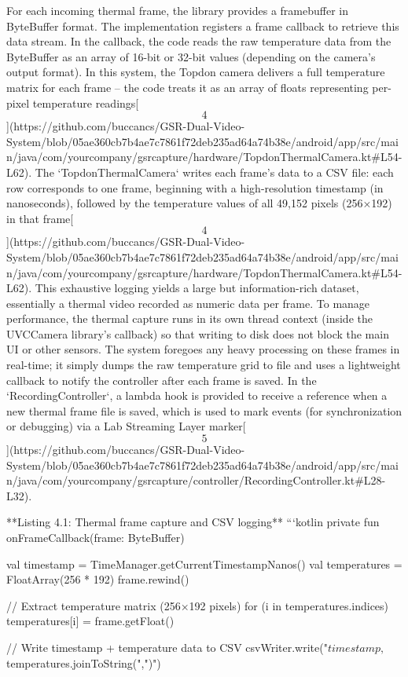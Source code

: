 \documentclass[12pt,a4paper]{article}
\begin{document}
{For each incoming thermal frame, the library provides a framebuffer in
ByteBuffer format. The implementation registers a frame callback to
retrieve this data stream. In the callback, the code reads the raw
temperature data from the ByteBuffer as an array of 16-bit or 32-bit
values (depending on the camera's output format). In this system, the
Topdon camera delivers a full temperature matrix for each frame -- the
code treats it as an array of floats representing per-pixel temperature
readings[\[4\]](https://github.com/buccancs/GSR-Dual-Video-System/blob/05ae360cb7b4ae7c7861f72deb235ad64a74b38e/android/app/src/main/java/com/yourcompany/gsrcapture/hardware/TopdonThermalCamera.kt#L54-L62).
The `TopdonThermalCamera` writes each frame's data to a CSV file: each
row corresponds to one frame, beginning with a high-resolution timestamp
(in nanoseconds), followed by the temperature values of all 49,152
pixels (256×192) in that
frame[\[4\]](https://github.com/buccancs/GSR-Dual-Video-System/blob/05ae360cb7b4ae7c7861f72deb235ad64a74b38e/android/app/src/main/java/com/yourcompany/gsrcapture/hardware/TopdonThermalCamera.kt#L54-L62).
This exhaustive logging yields a large but information-rich dataset,
essentially a thermal video recorded as numeric data per frame. To
manage performance, the thermal capture runs in its own thread context
(inside the UVCCamera library's callback) so that writing to disk does
not block the main UI or other sensors. The system foregoes any heavy
processing on these frames in real-time; it simply dumps the raw
temperature grid to file and uses a lightweight callback to notify the
controller after each frame is saved. In the `RecordingController`, a
lambda hook is provided to receive a reference when a new thermal frame
file is saved, which is used to mark events (for synchronization or
debugging) via a Lab Streaming Layer
marker[\[5\]](https://github.com/buccancs/GSR-Dual-Video-System/blob/05ae360cb7b4ae7c7861f72deb235ad64a74b38e/android/app/src/main/java/com/yourcompany/gsrcapture/controller/RecordingController.kt#L28-L32).

**Listing 4.1: Thermal frame capture and CSV logging**
```kotlin
private fun onFrameCallback(frame: ByteBuffer) {
    val timestamp = TimeManager.getCurrentTimestampNanos()
    val temperatures = FloatArray(256 * 192)
    frame.rewind()
    
    // Extract temperature matrix (256×192 pixels)
    for (i in temperatures.indices) {
        temperatures[i] = frame.getFloat()
    }
    
    // Write timestamp + temperature data to CSV
    csvWriter.write("$timestamp,${temperatures.joinToString(",")}\n")
    
}}
\end{document}
